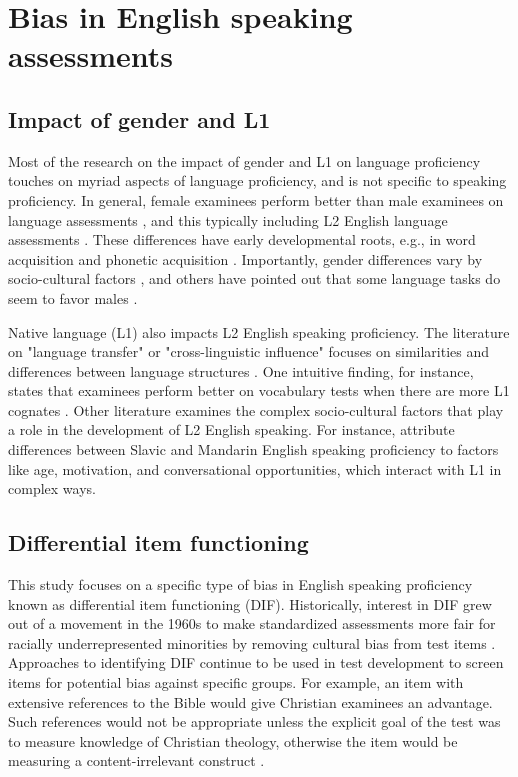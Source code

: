 \documentclass [PhD] {uclathes}
\begin{document}
\section{Bias in English speaking assessments}

\subsection{Impact of gender and L1}

Most of the research on the impact of gender and L1 on language proficiency touches on myriad aspects of language proficiency, and is not specific to speaking proficiency. In general, female examinees perform better than male examinees on language assessments \citep{reilly2019gender}, and this typically including L2 English language assessments \citep{denies2022mapping}. These differences have early developmental roots, e.g., in word acquisition \citep{kaushanskaya2013gender} and phonetic acquisition \citep{dodd2003phonological}. Importantly, gender differences vary by socio-cultural factors \citep{denies2022mapping}, and others have pointed out that some language tasks do seem to favor males \citep{wucherer2018language}. 

Native language (L1) also impacts L2 English speaking proficiency. The literature on "language transfer" or "cross-linguistic influence" focuses on similarities and differences between language structures \citep[][p. 257]{brown2000principles}. One intuitive finding, for instance, states that examinees perform better on vocabulary tests when there are more L1 cognates \citep{lesniewska2018first}. Other literature examines the complex socio-cultural factors that play a role in the development of L2 English speaking. For instance, \citet{derwing2013development} attribute differences between Slavic and Mandarin English speaking proficiency to factors like age, motivation, and conversational opportunities, which interact with L1 in complex ways. 

\subsection{Differential item functioning}
\label{intro_dif}

This study focuses on a specific type of bias in English speaking proficiency known as differential item functioning (DIF). Historically, interest in DIF grew out of a movement in the 1960s to make standardized assessments more fair for racially underrepresented minorities by removing cultural bias from test items \citep{angoff1993}. Approaches to identifying DIF continue to be used in test development to screen items for potential bias against specific groups. For example, an item with extensive references to the Bible would give Christian examinees an advantage. Such references would not be appropriate unless the explicit goal of the test was to measure knowledge of Christian theology, otherwise the item would be measuring a content-irrelevant construct \citep{aera2014}.
\end{document}
